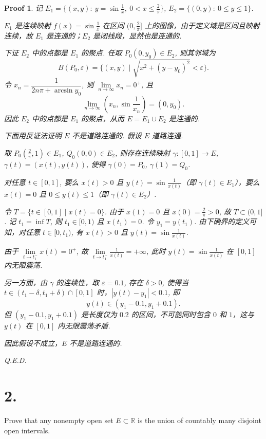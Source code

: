 \documentclass[a4paper,12pt]{article}
\newtheorem*{pf}{Proof}
\begin{document}
\begin{pf}
    记 $E_1 = \{(x,y) :\ y = \sin \frac{1}{x},\ 0 < x \leqslant \frac{2}{\pi}\}$, $E_2 = \{(0,y) :\ 0 \leqslant y \leqslant 1\}$.

    $E_1$ 是连续映射 $f(x) = \sin \frac{1}{x}$ 在区间 $(0, \frac{2}{\pi}]$ 上的图像，由于定义域是区间且映射连续，故 $E_1$ 是连通的；$E_2$ 是闭线段，显然也是连通的.

    下证 $E_2$ 中的点都是 $E_1$ 的聚点. 任取 $P_0(0, y_0) \in E_2$, 则其邻域为
    $$
        B(P_0, \varepsilon) = \{(x, y) \mid \sqrt{x^2 + (y - y_0)^2} < \varepsilon\}.
    $$
    令 $x_n = \dfrac{1}{2n\pi + \arcsin y_0}$, 则 $\lim\limits_{n \to \infty} x_n = 0^+$, 且
    $$
        \lim_{n \to \infty} (x_n, \sin \frac{1}{x_n}) = (0, y_0).
    $$
    因此 $E_2$ 中的点都是 $E_1$ 的聚点，从而 $E = E_1 \cup E_2$ 是连通的.

    下面用反证法证明 $E$ 不是道路连通的. 假设 $E$ 道路连通.

    取 $P_0(\frac{2}{\pi}, 1) \in E_1$, $Q_0(0, 0) \in E_2$, 则存在连续映射 $\gamma: [0, 1] \to E$, $\gamma(t) = (x(t), y(t))$, 使得 $\gamma(0) = P_0$, $\gamma(1) = Q_0$.

    对任意 $t \in [0, 1]$, 要么 $x(t) > 0$ 且 $y(t) = \sin \frac{1}{x(t)}$（即 $\gamma(t) \in E_1$），要么 $x(t) = 0$ 且 $0 \leq y(t) \leq 1$（即 $\gamma(t) \in E_2$）.

    令 $T = \{t \in [0, 1] \mid x(t) = 0\}$. 由于 $x(1) = 0$ 且 $x(0) = \frac{2}{\pi} > 0$, 故 $T \subset (0, 1]$. 记 $t_1 = \inf T$, 则 $t_1 \in [0, 1)$ 且 $x(t_1) = 0$. 令 $y_1 = y(t_1)$. 由下确界的定义可知，对任意 $t \in [0, t_1)$, 有 $x(t) > 0$ 且 $y(t) = \sin \frac{1}{x(t)}$.

    由于 $\lim\limits_{t \to t_1^-} x(t) = 0^+$, 故 $\lim\limits_{t \to t_1^-} \frac{1}{x(t)} = +\infty$, 此时 $y(t) = \sin \frac{1}{x(t)}$ 在 $[0, 1]$ 内无限震荡.

    另一方面，由 $\gamma$ 的连续性，取 $\varepsilon = 0.1$, 存在 $\delta > 0$, 使得当 $t \in (t_1 - \delta, t_1 + \delta) \cap [0, 1]$ 时，$|y(t) - y_1| < 0.1$, 即
    $$
        y(t) \in (y_1 - 0.1, y_1 + 0.1).
    $$
    但 $(y_1 - 0.1, y_1 + 0.1)$ 是长度仅为 $0.2$ 的区间，不可能同时包含 $0$ 和 $1$，这与 $y(t)$ 在 $[0, 1]$ 内无限震荡矛盾.

    因此假设不成立，$E$ 不是道路连通的.

    Q.E.D.
\end{pf}

\section*{2.} Prove that any nonempty open set $E \subset \mathbb{R}$ is the union of countably many disjoint open intervals.
\end{document}
